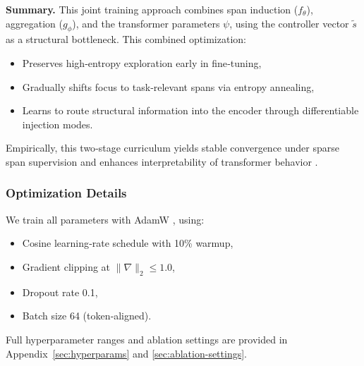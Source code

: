 \noindent\textbf{Summary.} This joint training approach combines span induction (\(f_\theta\)), aggregation (\(g_\phi\)), and the transformer parameters \(\psi\), using the controller vector \(\tilde{s}\) as a structural bottleneck.  This combined optimization:
\begin{itemize}
	\item Preserves high‐entropy exploration early in fine‐tuning,  
	\item Gradually shifts focus to task‐relevant spans via entropy annealing,  
	\item Learns to route structural information into the encoder through differentiable injection modes.
\end{itemize}
Empirically, this two‐stage curriculum yields stable convergence under sparse span supervision and enhances interpretability of transformer behavior \cite{belinkov2022probing}.

\subsubsection{Optimization Details}
\label{sec:optimization-details}

\medskip
\noindent We train all parameters with AdamW \cite{loshchilov2019decoupled}, using:
\begin{itemize}[leftmargin=1.5em]
	\item Cosine learning‐rate schedule with 10\% warmup,
	\item Gradient clipping at \(\|\nabla\|_2\le1.0\),
	\item Dropout rate 0.1,
	\item Batch size 64 (token‐aligned).
\end{itemize}
Full hyperparameter ranges and ablation settings are provided in Appendix~\ref{sec:hyperparams} and \ref{sec:ablation-settings}.
